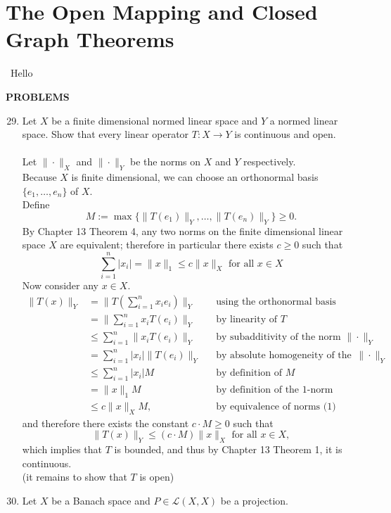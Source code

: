 \section{The Open Mapping and Closed Graph Theorems}\
Hello
\begin{center}
	\textbf{PROBLEMS}
\end{center}
\begin{enumerate}
	\setcounter{enumi}{28}
    \item Let $X$ be a finite dimensional normed linear space and $Y$ a normed linear space.
    Show that every linear operator $T:X\to Y$ is continuous and open.\\
    \\Let $\|\cdot\|_X$ and $\|\cdot\|_Y$ be the norms on $X$ and $Y$ respectively.
    \\Because $X$ is finite dimensional, we can choose an orthonormal basis $\{e_1,\dots,e_n\}$ of $X$.
    \\Define 
    \[
        M:=\max\{\|T(e_1)\|_Y,\dots,\|T(e_n)\|_Y\}\ge0.
    \]
    By Chapter 13 Theorem 4, any two norms on the finite dimensional linear space $X$ are equivalent; 
    therefore in particular there exists $c\ge0$ such that
    \[
        \sum_{i=1}^n|x_i|=\|x\|_1\le c\|x\|_X\text{ for all }x\in X\tag{1}
    \] 
    Now consider any $x\in X$.
    \begin{align*}
        \|T(x)\|_Y&=\|T(\sum_{i=1}^nx_ie_i)\|_Y&&\text{using the orthonormal basis}\\
        &=\|\sum_{i=1}^nx_iT(e_i)\|_Y&&\text{by linearity of }T\\
        &\le\sum_{i=1}^n\|x_iT(e_i)\|_Y&&\text{by subadditivity of the norm }\|\cdot\|_Y\\
        &=\sum_{i=1}^n|x_i|\|T(e_i)\|_Y&&\text{by absolute homogeneity of the norm }\|\cdot\|_Y\\
        &\le\sum_{i=1}^n|x_i|M&&\text{by definition of }M\\
        &=\|x\|_1M&&\text{by definition of the 1-norm}\\
        &\le c\|x\|_XM,&&\text{by equivalence of norms (1)}
    \end{align*}
    and therefore there exists the constant $c\cdot M\ge0$ such that 
    \[
        \|T(x)\|_Y\le(c\cdot M)\|x\|_X\text{ for all }x\in X,
    \]
    which implies that $T$ is bounded, and thus by Chapter 13 Theorem 1, it is continuous.
    \\(it remains to show that $T$ is open)
    \item Let $X$ be a Banach space and $P\in\mathcal{L}(X,X)$ be a projection.

\end{enumerate}
